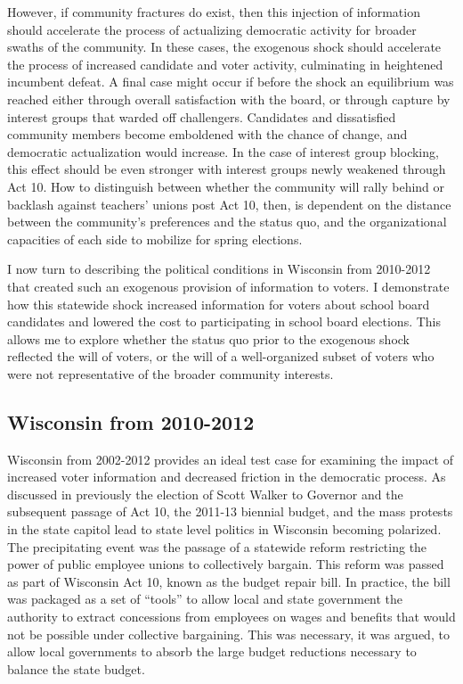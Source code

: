 However, if community fractures do exist, then this injection of 
information should accelerate the process of actualizing democratic activity 
for broader swaths of the community. In these cases, the exogenous shock should 
accelerate the process of increased candidate and voter activity, culminating 
in heightened incumbent defeat. A final case might occur if before the shock an 
equilibrium was reached either through overall satisfaction with the board, or 
through capture by interest groups that warded off challengers. Candidates and 
dissatisfied community members become emboldened with the chance 
of change, and democratic actualization would increase. In the case of interest 
group blocking, this effect should be even stronger with interest groups newly 
weakened through Act 10. How to distinguish between whether the community will 
rally behind or backlash against teachers' unions post Act 10, then, is dependent 
on the distance between the community's preferences and the status quo, and the 
organizational capacities of each side to mobilize for spring elections.

I now turn to describing the political conditions 
in Wisconsin from 2010-2012 that created such an exogenous provision of information 
to voters. I demonstrate how this statewide shock increased information for voters 
about school board candidates and lowered the cost to participating in school board 
elections. This allows me to explore whether the status quo prior to the exogenous
shock reflected the will of voters, or the will of a well-organized subset of 
voters who were not representative of the broader community interests. 

\subsection{Wisconsin from 2010-2012}

Wisconsin from 2002-2012 provides an ideal test case for examining the impact 
of increased voter information and decreased friction in the democratic process. 
As discussed in previously the election of Scott Walker to Governor and the 
subsequent passage of Act 10, the 2011-13 biennial budget, and the mass protests 
in the state capitol lead to state level politics in Wisconsin becoming polarized. 
The precipitating event was the passage of a statewide reform restricting the 
power of public employee unions to collectively bargain. This reform was passed 
as part of Wisconsin Act 10, known as the budget repair bill. In practice, the 
bill was packaged as a set of ``tools'' to allow local and state government the
authority to extract concessions from employees on wages and benefits that would 
not be possible under collective bargaining. This was necessary, it was argued, 
to allow local governments to absorb the large budget reductions necessary to 
balance the state budget. 

